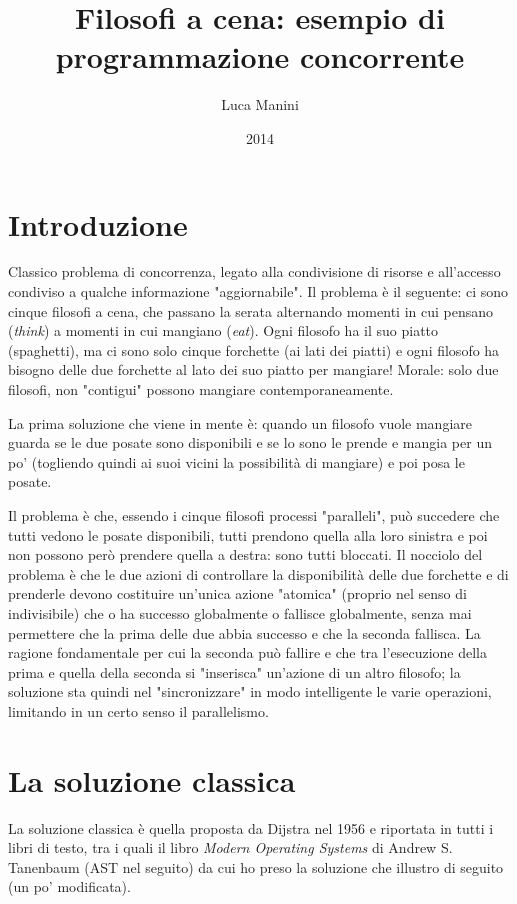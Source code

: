 \documentclass{article}
\author{Luca Manini}
\date{2014}
\title{Filosofi a cena: esempio di programmazione concorrente}
\begin{document}
\maketitle
\section{Introduzione}
\label{sec-1}

Classico problema di concorrenza, legato alla condivisione di
risorse e all'accesso condiviso a qualche informazione
"aggiornabile".  Il problema è il seguente: ci sono cinque filosofi
a cena, che passano la serata alternando momenti in cui pensano
(\emph{think}) a momenti in cui mangiano (\emph{eat}).  Ogni filosofo ha il
suo piatto (spaghetti), ma ci sono solo cinque forchette (ai lati
dei piatti) e ogni filosofo ha bisogno delle due forchette al lato
dei suo piatto per mangiare! Morale: solo due filosofi, non
"contigui" possono mangiare contemporaneamente.

La prima soluzione che viene in mente è: quando un filosofo vuole
mangiare guarda se le due posate sono disponibili e se lo sono le
prende e mangia per un po' (togliendo quindi ai suoi vicini la
possibilità di mangiare) e poi posa le posate.  

Il problema è che, essendo i cinque filosofi processi "paralleli",
può succedere che tutti vedono le posate disponibili, tutti prendono
quella alla loro sinistra e poi non possono però prendere quella a
destra: sono tutti bloccati.  Il nocciolo del problema è che le due
azioni di controllare la disponibilità delle due forchette e di
prenderle devono costituire un'unica azione "atomica" (proprio nel
senso di indivisibile) che o ha successo globalmente o fallisce
globalmente, senza mai permettere che la prima delle due abbia
successo e che la seconda fallisca.  La ragione fondamentale per cui
la seconda può fallire e che tra l'esecuzione della prima e quella
della seconda si "inserisca" un'azione di un altro filosofo; la
soluzione sta quindi nel "sincronizzare" in modo intelligente le
varie operazioni, limitando in un certo senso il parallelismo.

\section{La soluzione classica}
\label{sec-2}


La soluzione classica è quella proposta da Dijstra nel 1956 e
riportata in tutti i libri di testo, tra i quali il libro \emph{Modern
Operating Systems} di Andrew S. Tanenbaum (AST nel seguito) da cui
ho preso la soluzione che illustro di seguito (un po' modificata).
\end{document}
